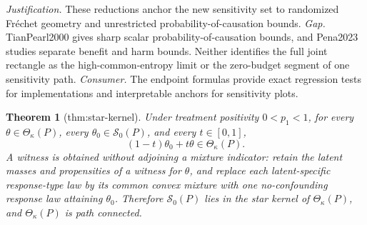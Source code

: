 \documentclass{article}
\newtheorem{theorem}{Theorem}
\begin{document}
\par\smallskip\noindent \textit{Justification.} These reductions anchor the new sensitivity set to randomized Fréchet geometry and unrestricted probability-of-causation bounds. \textit{Gap.} TianPearl2000 gives sharp scalar probability-of-causation bounds, and Pena2023 studies separate benefit and harm bounds. Neither identifies the full joint rectangle as the high-common-entropy limit or the zero-budget segment of one sensitivity path. \textit{Consumer.} The endpoint formulas provide exact regression tests for implementations and interpretable anchors for sensitivity plots.

\begin{theorem}[thm:star-kernel]\label{thm:star-kernel}
Under treatment positivity \(0<p_1<1\), for every \(\theta\in\Theta_\kappa(P)\), every \(\theta_0\in\mathcal S_0(P)\), and every \(t\in[0,1]\), \[(1-t)\theta_0+t\theta\in\Theta_\kappa(P).\] A witness is obtained without adjoining a mixture indicator: retain the latent masses and propensities of a witness for \(\theta\), and replace each latent-specific response-type law by its common convex mixture with one no-confounding response law attaining \(\theta_0\). Therefore \(\mathcal S_0(P)\) lies in the star kernel of \(\Theta_\kappa(P)\), and \(\Theta_\kappa(P)\) is path connected.
\end{theorem}
\end{document}
